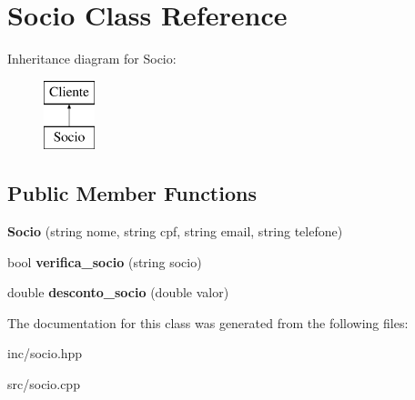 \hypertarget{class_socio}{}\section{Socio Class Reference}
\label{class_socio}
Inheritance diagram for Socio\+:\begin{figure}[H]
\begin{center}
\leavevmode
\includegraphics[height=2.000000cm]{class_socio}
\end{center}
\end{figure}
\subsection*{Public Member Functions}
\begin{DoxyCompactItemize}
\item 
\mbox{\label{class_socio_a20417da9fca1fedf8d6526bb5726d1c4}} 
{\bfseries Socio} (string nome, string cpf, string email, string telefone)
\item 
\mbox{\label{class_socio_a485c34043429f469752e2396b54a9494}} 
bool {\bfseries verifica\+\_\+socio} (string socio)
\item 
\mbox{\label{class_socio_a8d0dba2699f6cf66b6c5b5bb6dc97853}} 
double {\bfseries desconto\+\_\+socio} (double valor)
\end{DoxyCompactItemize}


The documentation for this class was generated from the following files\+:\begin{DoxyCompactItemize}
\item 
inc/socio.\+hpp\item 
src/socio.\+cpp\end{DoxyCompactItemize}
